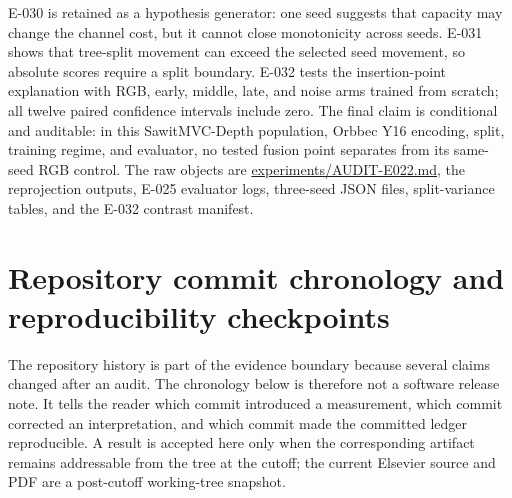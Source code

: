 \documentclass[preprint,12pt]{elsarticle}
\newcommand{\pathcode}[1]{\scriptsize\url{#1}}
\begin{document}
E-030 is retained as a hypothesis generator: one seed suggests that capacity
may change the channel cost, but it cannot close monotonicity across seeds.
E-031 shows that tree-split movement can exceed the selected seed movement,
so absolute scores require a split boundary. E-032 tests the insertion-point
explanation with RGB, early, middle, late, and noise arms trained from
scratch; all twelve paired confidence intervals include zero. The final claim
is conditional and auditable: in this SawitMVC-Depth population, Orbbec Y16
encoding, split, training regime, and evaluator, no tested fusion point
separates from its same-seed RGB control. The raw objects are
\pathcode{experiments/AUDIT-E022.md}, the reprojection outputs, E-025 evaluator logs,
three-seed JSON files, split-variance tables, and the E-032 contrast manifest.

\section{Repository commit chronology and reproducibility checkpoints}
\label{app:commit-chronology}
The repository history is part of the evidence boundary because several claims
changed after an audit. The chronology below is therefore not a software
release note. It tells the reader which commit introduced a measurement,
which commit corrected an interpretation, and which commit made the committed
ledger reproducible. A result is accepted here only when the corresponding
artifact remains addressable from the tree at the cutoff; the current Elsevier
source and PDF are a post-cutoff working-tree snapshot.
\end{document}
